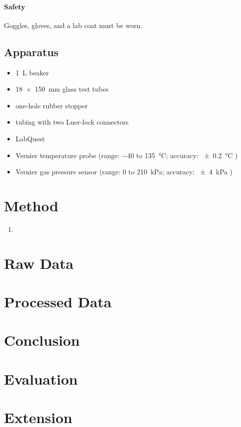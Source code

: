 \documentclass[a4paper, 12pt]{article}
\begin{document}
\paragraph{Safety} 
Goggles, gloves, and a lab coat must be worn.

\subsection{Apparatus}
\begin{multicols}{2}
\begin{itemize}
    \item \SI{1}{\L} beaker
    \item \SI{18x150}{\mm} glass test tubes
    \item one-hole rubber stopper
    \item tubing with two Luer-lock connectors
\columnbreak
    \item LabQuest
    \item Vernier temperature probe (range: \num{-40} to \SI{135}{\celsius}; accuracy: \SI{+-0.2}{\celsius} \autocite{vernier_temperature})
    \item Vernier gas pressure sensor (range: \num{0} to \SI{210}{\kPa}; accuracy: \SI{+-4}{\kPa} \autocite{vernier_gas_pressure})
\end{itemize}
    
\end{multicols}

\section{Method}
\begin{enumerate}
    \item 
\end{enumerate}

\section{Raw Data}

\section{Processed Data}

\section{Conclusion}

\section{Evaluation}

\section{Extension}

\printbibliography
\end{document}
